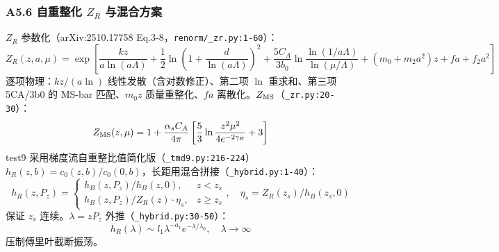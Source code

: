 \documentclass[UTF8]{ctexart}
\begin{document}
\subsubsection{A5.6 自重整化 $Z_R$ 与混合方案}
$Z_R$ 参数化（arXiv:2510.17758 Eq.3-8，\texttt{\nolinkurl{renorm/\_zr.py:1-60}}）：
\begin{equation}
Z_R(z,a,\mu)=\exp\left[\frac{kz}{a\ln(a\Lambda)}+\frac12\ln\!\left(1+\frac{d}{\ln(a\Lambda)}\right)^2+\frac{5C_A}{3b_0}\ln\frac{\ln(1/a\Lambda)}{\ln(\mu/\Lambda)}+(m_0+m_2a^2)z+fa+f_2a^2\right]
\label{eq:ZR}
\end{equation}
逐项物理：$kz/(a\ln)$ 线性发散（含对数修正）、第二项 $\ln$ 重求和、第三项 5CA/3b0 的 MS-bar 匹配、$m_0z$ 质量重整化、$fa$ 离散化。$Z_{\rm MS}$（\texttt{\nolinkurl{\_zr.py:20-30}}）：
\begin{equation}
Z_{\rm MS}(z,\mu)=1+\frac{\alpha_s C_A}{4\pi}\left[\frac53\ln\frac{z^2\mu^2}{4e^{-2\gamma_E}}+3\right]
\label{eq:ZMS}
\end{equation}
test9 采用梯度流自重整比值简化版（\texttt{\nolinkurl{\_tmd9.py:216-224}}）$h_R(z,b)=c_0(z,b)/c_0(0,b)$，长距用混合拼接（\texttt{\nolinkurl{\_hybrid.py:1-40}}）：
\begin{equation}
h_R(z,P_z)=\begin{cases} h_B(z,P_z)/h_B(z,0), & z<z_s \\ h_B(z,P_z)/Z_R(z)\cdot\eta_s, & z\ge z_s \end{cases},\quad \eta_s=Z_R(z_s)/h_B(z_s,0)
\label{eq:hybrid}
\end{equation}
保证 $z_s$ 连续。$\lambda=zP_z$ 外推（\texttt{\nolinkurl{\_hybrid.py:30-50}}）：
\begin{equation}
h_R(\lambda)\sim l_1\lambda^{-a_1}e^{-\lambda/\lambda_0},\quad \lambda\to\infty
\label{eq:lambdaExtrap}
\end{equation}
压制傅里叶截断振荡。
\end{document}
